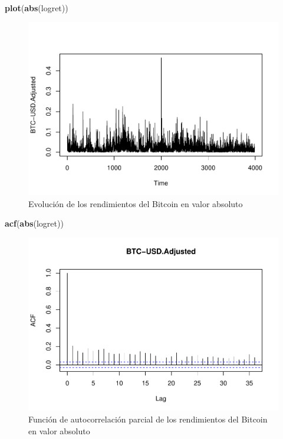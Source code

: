 \documentclass[
]{book}
\newenvironment{Shaded}{\begin{snugshade}}{\end{snugshade}}
\newcommand{\FunctionTok}[1]{\textcolor[rgb]{0.13,0.29,0.53}{\textbf{#1}}}
\newcommand{\NormalTok}[1]{#1}
\begin{document}
\begin{Shaded}
\begin{Highlighting}[]
\FunctionTok{plot}\NormalTok{(}\FunctionTok{abs}\NormalTok{(logret))}
\end{Highlighting}
\end{Shaded}

\begin{figure}

{\centering \includegraphics{Notas-Series-Tiempo_files/figure-latex/fig106-1} 

}

\caption{Evolución de los rendimientos del Bitcoin en valor absoluto}\label{fig:fig106}
\end{figure}

\begin{Shaded}
\begin{Highlighting}[]
\FunctionTok{acf}\NormalTok{(}\FunctionTok{abs}\NormalTok{(logret))}
\end{Highlighting}
\end{Shaded}

\begin{figure}

{\centering \includegraphics{Notas-Series-Tiempo_files/figure-latex/fig107-1} 

}

\caption{Función de autocorrelación parcial de los rendimientos del Bitcoin en valor absoluto}\label{fig:fig107}
\end{figure}
\end{document}
